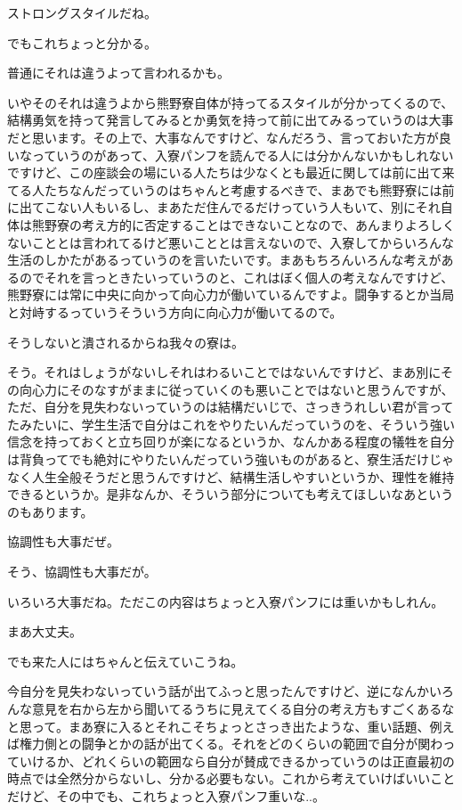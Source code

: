 \begin{multicols}{2}
ストロングスタイルだね。

でもこれちょっと分かる。

普通にそれは違うよって言われるかも。

いやそのそれは違うよから熊野寮自体が持ってるスタイルが分かってくるので、結構勇気を持って発言してみるとか勇気を持って前に出てみるっていうのは大事だと思います。その上で、大事なんですけど、なんだろう、言っておいた方が良いなっていうのがあって、入寮パンフを読んでる人には分かんないかもしれないですけど、この座談会の場にいる人たちは少なくとも最近に関しては前に出て来てる人たちなんだっていうのはちゃんと考慮するべきで、まあでも熊野寮には前に出てこない人もいるし、まあただ住んでるだけっていう人もいて、別にそれ自体は熊野寮の考え方的に否定することはできないことなので、あんまりよろしくないこととは言われてるけど悪いこととは言えないので、入寮してからいろんな生活のしかたがあるっていうのを言いたいです。まあもちろんいろんな考えがあるのでそれを言っときたいっていうのと、これはぼく個人の考えなんですけど、熊野寮には常に中央に向かって向心力が働いているんですよ。闘争するとか当局と対峙するっていうそういう方向に向心力が働いてるので。

そうしないと潰されるからね我々の寮は。

そう。それはしょうがないしそれはわるいことではないんですけど、まあ別にその向心力にそのなすがままに従っていくのも悪いことではないと思うんですが、ただ、自分を見失わないっていうのは結構だいじで、さっきうれしい君が言ってたみたいに、学生生活で自分はこれをやりたいんだっていうのを、そういう強い信念を持っておくと立ち回りが楽になるというか、なんかある程度の犠牲を自分は背負ってでも絶対にやりたいんだっていう強いものがあると、寮生活だけじゃなく人生全般そうだと思うんですけど、結構生活しやすいというか、理性を維持できるというか。是非なんか、そういう部分についても考えてほしいなあというのもあります。

協調性も大事だぜ。

そう、協調性も大事だが。

いろいろ大事だね。ただこの内容はちょっと入寮パンフには重いかもしれん。

まあ大丈夫。

でも来た人にはちゃんと伝えていこうね。

今自分を見失わないっていう話が出てふっと思ったんですけど、逆になんかいろんな意見を右から左から聞いてるうちに見えてくる自分の考え方もすごくあるなと思って。まあ寮に入るとそれこそちょっとさっき出たような、重い話題、例えば権力側との闘争とかの話が出てくる。それをどのくらいの範囲で自分が関わっていけるか、どれくらいの範囲なら自分が賛成できるかっていうのは正直最初の時点では全然分からないし、分かる必要もない。これから考えていけばいいことだけど、その中でも、これちょっと入寮パンフ重いな..。


\end{multicols}
